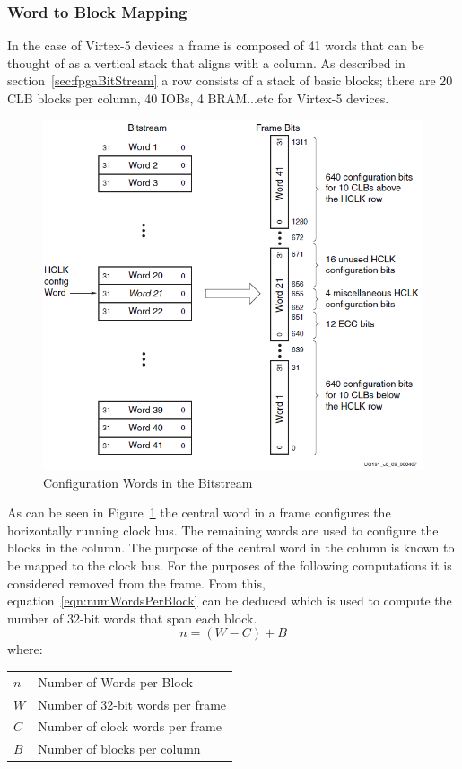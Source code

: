 \documentclass[conference]{IEEEtran}
\makeatletter
\newcommand{\ConditionSize}{\footnotesize}
\newenvironment{conditions}
{\par\vspace{\abovedisplayskip}\noindent\begin{tabular}{>{$}l<{$} @{${}={}$} l}}
	{\end{tabular}\par\vspace{\belowdisplayskip}}
\makeatother
\begin{document}
\subsubsection{Word to Block Mapping}
In the case of Virtex-5 devices a frame is composed of 41 words that can be thought of as a vertical stack that aligns with a column.
As described in section~\ref{sec:fpgaBitStream} a row consists of a stack of basic blocks; there are 20 \acrshort{CLB} blocks per column, 40 \acrshort{IOB}s, 4 \acrshort{BRAM}...etc for Virtex-5 devices.
\begin{figure}[h]
	\centering
	\includegraphics[width=0.9\linewidth]{../Thesis/Figures/frameTileMap}
	\caption[Configuration Words in the Bitstream~\cite{virtex5ConfigGuide}]{Configuration Words in the Bitstream~\cite{virtex5ConfigGuide}}
	\label{fig:frameTileMap}
\end{figure}
As can be seen in Figure~\ref{fig:frameTileMap} the central word in a frame configures the horizontally running clock bus.
The remaining words are used to configure the blocks in the column.
The purpose of the central word in the column is known to be mapped to the clock bus.
For the purposes of the following computations it is considered removed from the frame.
From this, equation~\ref{eqn:numWordsPerBlock} can be deduced which is used to compute the number of 32-bit words that span each block.
\begin{equation} \label{eqn:numWordsPerBlock}
n = (W - C) + B
\end{equation}
\ConditionSize
where:
\begin{conditions}
	n     &  Number of Words per Block \\
	W     &  Number of 32-bit words per frame \\   
	C     &  Number of clock words per frame \\
	B     &  Number of blocks per column
\end{conditions}
\end{document}
